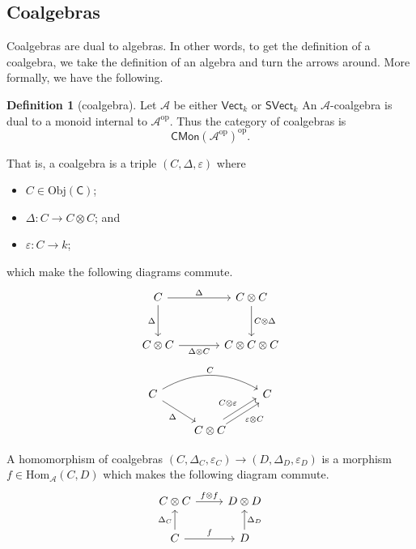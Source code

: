 \documentclass[a4paper,10pt]{scrreprt}
\newcommand{\Obj}{\mathrm{Obj}}
\newcommand{\Hom}{\mathrm{Hom}}
\theoremstyle{definition}
\newtheorem{definition}{Definition}[section]
\theoremstyle{plain}
\theoremstyle{remark}
\begin{document}
\subsection{Coalgebras}
Coalgebras are dual to algebras. In other words, to get the definition of a coalgebra, we take the definition of an algebra and turn the arrows around. More formally, we have the following.

\begin{definition}[coalgebra]
  \label{def:coalgebra}
  Let $\mathscr{A}$ be either $\mathsf{Vect}_{k}$ or $\mathsf{SVect}_{k}$ An $\mathscr{A}$-coalgebra is dual to a monoid internal to $\mathscr{A}^{\mathrm{op}}$. Thus the category of coalgebras is 
  \begin{equation*}
    \mathsf{CMon}(\mathscr{A}^{\mathrm{op}})^{\mathrm{op}}.
  \end{equation*}

  That is, a coalgebra is a triple $(C, \Delta, \varepsilon)$ where 
  \begin{itemize}
    \item $C \in \Obj(\mathsf{C})$;

    \item $\Delta\colon C \to C \otimes C$; and

    \item $\varepsilon\colon C \to k$;
  \end{itemize}
  which make the following diagrams commute.
  \begin{equation*}
    \begin{tikzcd}[row sep=large, column sep=large]
      C
      \arrow[r, "\Delta"]
      \arrow[d, swap, "\Delta"]
      & C \otimes C
      \arrow[d, "C \otimes \Delta"]
      \\
      C \otimes C
      \arrow[r, swap, "\Delta \otimes C"]
      & C \otimes C \otimes C
    \end{tikzcd}
  \end{equation*}
  \begin{equation*}
    \begin{tikzcd}
      C 
      \arrow[rr, bend left, "C"]
      \arrow[rd, swap, "\Delta"]
      && C
      \\
      & C \otimes C
      \arrow[ru, shift left, "C \otimes \varepsilon"]
      \arrow[ru, shift right, swap, "\varepsilon \otimes C"]
    \end{tikzcd}
  \end{equation*}

  A homomorphism of coalgebras $(C, \Delta_{C}, \varepsilon_{C}) \to (D, \Delta_{D}, \varepsilon_{D})$ is a morphism $f \in \Hom_{\mathscr{A}}(C, D)$ which makes the following diagram commute.
  \begin{equation*}
    \begin{tikzcd}
      C \otimes C
      \arrow[r, "f \otimes f"]
      & D \otimes D
      \\
      C 
      \arrow[r, "f"]
      \arrow[u, "\Delta_{C}"]
      & D
      \arrow[u, swap, "\Delta_{D}"]
    \end{tikzcd}
  \end{equation*}
\end{definition}
\end{document}
